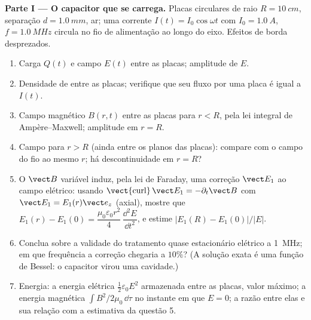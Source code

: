 \begin{problem}
\label{pb:b2:maxwell-equations:1}

\medskip
\noindent\textbf{Parte I --- O capacitor que se carrega.}
Placas circulares de raio $R = \qty{10}{cm}$, separação $d = \qty{1.0}{mm}$,
ar; uma corrente $I(t) = I_0\cos\omega t$ com $I_0 = \qty{1.0}{A}$, $f = \qty{1.0}{MHz}$
circula no fio de alimentação ao longo do eixo. Efeitos de borda desprezados.
\begin{enumerate}
  \item Carga $Q(t)$ e campo $E(t)$ entre as placas; amplitude de
        $E$.
  \item Densidade de  entre as placas; verifique que
        seu fluxo por uma placa é igual a $I(t)$.
  \item Campo magnético $B(r, t)$ entre as placas para $r < R$, pela
        lei integral de Ampère--Maxwell; amplitude em $r = R$.
  \item Campo para $r > R$ (ainda entre os planos das placas):
        compare com o campo do fio ao mesmo $r$; há
        descontinuidade em $r = R$?
  \item O $\vect B$ variável induz, pela lei de Faraday, uma correção
        $\vect E_1$ ao campo elétrico: usando $\operatorname{\vect{curl}}\vect E_1
        = -\partial_t\vect B$ com $\vect E_1 = E_1(r)\vect e_z$ (axial), mostre que
        $E_1(r) - E_1(0) = \dfrac{\mu_0\varepsilon_0r^2}4\,\dfrac{\dd^2E}{\dd t^2}$, e
        estime $|E_1(R) - E_1(0)|/|E|$.
  \item Conclua sobre a validade do tratamento quase estacionário
        elétrico a \qty{1}{MHz}; em que frequência a correção
        chegaria a $10\%$? (A solução exata é uma função de Bessel: o
        capacitor virou uma cavidade.)
  \item Energia: a energia elétrica $\tfrac12\varepsilon_0E^2$ armazenada entre as
        placas, valor máximo; a energia magnética $\int B^2/2\mu_0\,\dd\tau$
        no instante em que $E = 0$; a razão entre elas e sua relação com a
        estimativa da questão 5.
\end{enumerate}


\end{problem}
